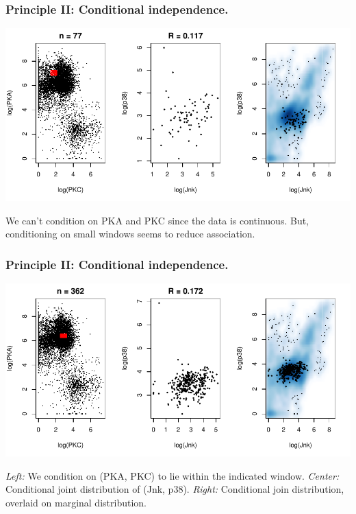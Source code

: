 \documentclass{beamer}
\begin{document}
\begin{frame}
\frametitle{Principle II: Conditional independence.}

\begin{center}
\includegraphics[scale = 0.7]{../images/plot03_02.pdf}
\end{center}

We can't condition on PKA and PKC since the data is continuous.
But, conditioning on small windows seems to reduce association.

\end{frame}


\begin{frame}
\frametitle{Principle II: Conditional independence.}

\begin{center}
\includegraphics[scale = 0.7]{../images/plot03_03.pdf}
\end{center}

\emph{Left:} We condition on (PKA, PKC) to lie within the indicated window.
\emph{Center:} Conditional joint distribution of (Jnk, p38).
\emph{Right:} Conditional join distribution, overlaid on marginal distribution.
\end{frame}
\end{document}
